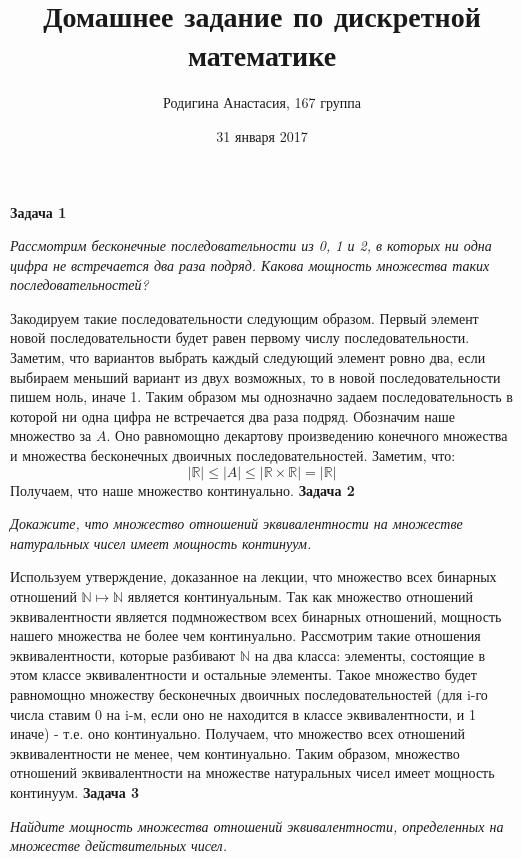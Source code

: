 \documentclass{article}
\title{Домашнее задание по дискретной математике}
\author{Родигина Анастасия, 167 группа}
\date{31 января 2017}
\begin{document}
            

\maketitle  
 \noindent \textbf{Задача 1}
\begin{center} 
\textit{Рассмотрим бесконечные последовательности из 0, 1 и 2, в которых ни одна цифра не встречается два раза подряд. Какова мощность множества таких последовательностей?}
\end{center}
Закодируем такие последовательности следующим образом. Первый элемент новой последовательности будет равен первому числу последовательности. Заметим, что вариантов выбрать каждый следующий элемент ровно два, если выбираем меньший вариант из двух возможных, то в новой последовательности пишем ноль, иначе 1. Таким образом мы однозначно задаем последовательность  в которой ни одна цифра не встречается два раза подряд. Обозначим наше множество за $A$. Оно равномощно декартову произведению конечного множества и множества бесконечных двоичных последовательностей. Заметим, что:
$$|\mathbb{R}| \leq |A| \leq |\mathbb{R} \times \mathbb{R}| = |\mathbb{R}|$$
Получаем, что наше множество континуально.
\newline
\newline
\textbf{Задача 2}
\begin{center}
\textit{Докажите, что множество отношений эквивалентности на множестве натуральных чисел имеет мощность континуум.}
\end{center}
Используем утверждение, доказанное на лекции, что множество всех бинарных отношений  $\mathbb{N}\mapsto \mathbb{N}$ является континуальным. Так как множество отношений эквивалентности является подмножеством всех бинарных отношений, мощность нашего множества не более чем континуально. Рассмотрим такие отношения эквивалентности, которые разбивают $\mathbb{N}$ на два класса: элементы, состоящие в этом классе эквивалентности и остальные элементы. Такое множество будет равномощно множеству бесконечных двоичных последовательностей (для i-го числа ставим 0 на i-м, если оно не находится в классе эквивалентности, и 1 иначе) - т.е. оно континуально. Получаем, что множество всех отношений эквивалентности не менее, чем континуально. Таким образом, множество отношений эквивалентности на множестве натуральных чисел имеет мощность континуум.
 \newline
 \newline
\textbf{Задача 3}
\begin{center}
\textit{Найдите мощность множества отношений эквивалентности, определенных на множестве действительных чисел.} 
\end{center}
\end{document}
